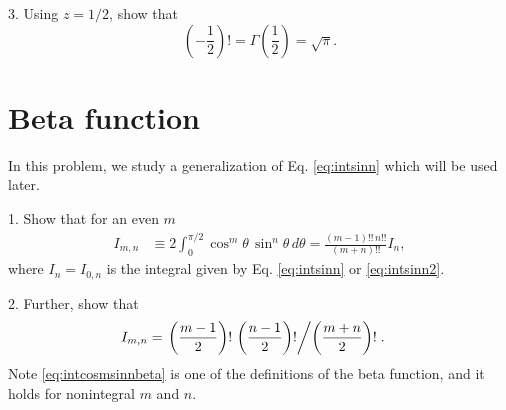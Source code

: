 \documentclass{book}
\begin{document}
3. Using $z = 1/2$, show that
\begin{equation}
  \left( -\frac 1 2 \right)!
=
  \Gamma\left( \frac 1 2 \right)
=
  \sqrt \pi.
  \label{eq:gammahalf}
\end{equation}



\section{Beta function}






In this problem, we study a generalization of Eq. \eqref{eq:intsinn}
which will be used later.

1. Show that for an even $m$
\begin{align}
  I_{m, n}
& \equiv
  2 \int_0^{\pi/2} \cos^m \theta \, \sin^n \theta \, d\theta
=
  \frac{(m-1)!! \, n!!} { (m+n)!! } I_{n},
  \label{eq:intcosmsinn}
\end{align}
where $I_{n} = I_{0, n}$
is the integral given by Eq. \eqref{eq:intsinn} or \eqref{eq:intsinn2}.


2. Further, show that
\begin{align}
  I_{m, n}
&=
  \left.
    \left( \frac{ m - 1}{2} \right)! \, \left(\frac {n - 1} 2\right)!
  \middle/
    \left( \frac {m + n} 2 \right)!
  \right..
  \label{eq:intcosmsinnbeta}
\end{align}
Note \eqref{eq:intcosmsinnbeta}
is one of the definitions of the beta function,
and it holds for nonintegral $m$ and $n$.
\end{document}
